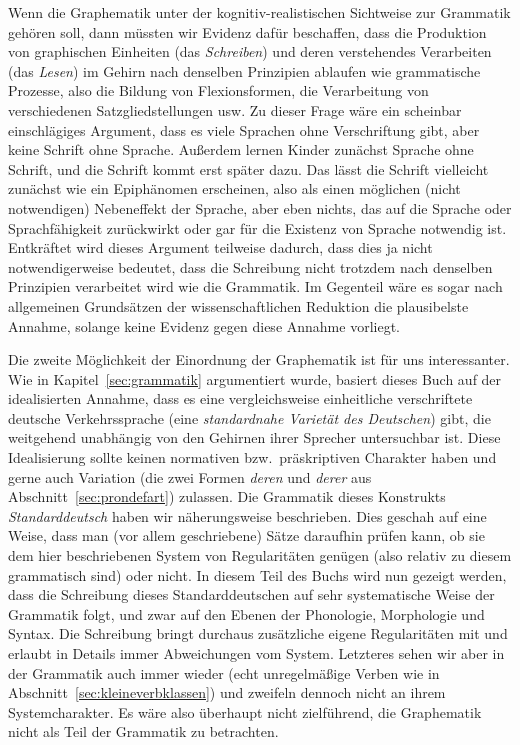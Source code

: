 Wenn die Graphematik unter der kognitiv-realistischen Sichtweise zur Grammatik gehören soll, dann müssten wir Evidenz dafür beschaffen, dass die Produktion von graphischen Einheiten (das \textit{Schreiben}) und deren verstehendes Verarbeiten (das \textit{Lesen}) im Gehirn nach denselben Prinzipien ablaufen wie grammatische Prozesse, also die Bildung von Flexionsformen, die Verarbeitung von verschiedenen Satzgliedstellungen usw.
Zu dieser Frage wäre ein scheinbar einschlägiges Argument, dass es viele Sprachen ohne Verschriftung gibt, aber keine Schrift ohne Sprache.
Außerdem lernen Kinder zunächst Sprache ohne Schrift, und die Schrift kommt erst später dazu.
Das lässt die Schrift vielleicht zunächst wie ein Epiphänomen erscheinen, also als einen möglichen (nicht notwendigen) Nebeneffekt der Sprache, aber eben nichts, das auf die Sprache oder Sprachfähigkeit zurückwirkt oder gar für die Existenz von Sprache notwendig ist.
Entkräftet wird dieses Argument teilweise dadurch, dass dies ja nicht notwendigerweise bedeutet, dass die Schreibung nicht trotzdem nach denselben Prinzipien verarbeitet wird wie die Grammatik.
Im Gegenteil wäre es sogar nach allgemeinen Grundsätzen der wissenschaftlichen Reduktion die plausibelste Annahme, solange keine Evidenz gegen diese Annahme vorliegt.

Die zweite Möglichkeit der Einordnung der Graphematik ist für uns interessanter.
Wie in Kapitel~\ref{sec:grammatik} argumentiert wurde, basiert dieses Buch auf der idealisierten Annahme, dass es eine vergleichsweise einheitliche verschriftete deutsche Verkehrssprache (eine \textit{standardnahe Varietät des Deutschen}) gibt, die weitgehend unabhängig von den Gehirnen ihrer Sprecher untersuchbar ist.
Diese Idealisierung sollte keinen normativen bzw.\ präskriptiven Charakter haben und gerne auch Variation (\zB die zwei Formen \textit{deren} und \textit{derer} aus Abschnitt~\ref{sec:prondefart}) zulassen.
Die Grammatik dieses Konstrukts \textit{Standarddeutsch} haben wir näherungsweise beschrieben.
Dies geschah auf eine Weise, dass man (vor allem geschriebene) Sätze daraufhin prüfen kann, ob sie dem hier beschriebenen System von Regularitäten genügen (also relativ zu diesem grammatisch sind) oder nicht.
In diesem Teil des Buchs wird nun gezeigt werden, dass die Schreibung dieses Standarddeutschen auf sehr systematische Weise der Grammatik folgt, und zwar auf den Ebenen der Phonologie, Morphologie und Syntax.
Die Schreibung bringt durchaus zusätzliche eigene Regularitäten mit und erlaubt in Details immer Abweichungen vom System.
Letzteres sehen wir aber in der Grammatik auch immer wieder (\zB echt unregelmäßige Verben wie in Abschnitt~\ref{sec:kleineverbklassen}) und zweifeln dennoch nicht an ihrem Systemcharakter.
Es wäre also überhaupt nicht zielführend, die Graphematik nicht als Teil der Grammatik zu betrachten.


